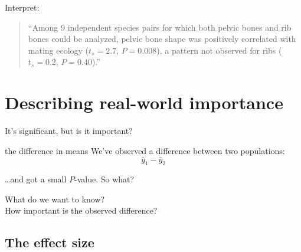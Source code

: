\begin{frame}{Interpret:}

  \begin{quote}
    ``Among 9 independent species pairs for which both pelvic bones and rib bones could be analyzed, pelvic bone shape was positively correlated with mating ecology ($t_s=2.7$, $P=0.008$), a pattern not observed for ribs ($t_s=0.2$, $P=0.40$).''
  \end{quote}

\end{frame}



\section{Describing real-world importance}


\begin{frame}{It's significant, but is it important?}


    \begin{block}{the difference in means}
        We've observed a difference between two populations:
        \[  \bar y_1 - \bar y_2 \]
    \end{block}

    \ldots and got a small $P$-value.  So what?

    \vspace{2em}

     What do we want to know?\\
    How important is the observed difference?


\end{frame}


\subsection{The effect size}

